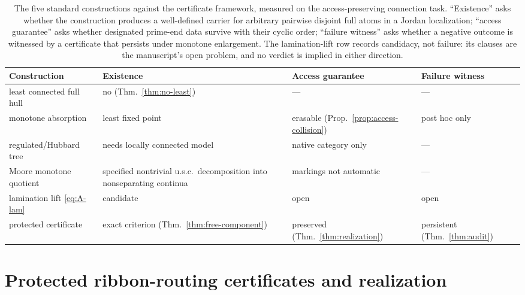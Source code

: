 \documentclass[11pt,reqno]{amsart}
\theoremstyle{definition}
\theoremstyle{remark}
\begin{document}
\begin{table}[H]
\centering
\small
\begin{tabularx}{\textwidth}{@{}P{0.25\textwidth}P{0.22\textwidth}P{0.22\textwidth}Y@{}}
\toprule
Construction & Existence & Access guarantee & Failure witness\\
\midrule
least connected full hull & no (Thm.~\ref{thm:no-least}) & --- & ---\\
monotone absorption & least fixed point \cite{MWman} &
  erasable (Prop.~\ref{prop:access-collision}) & post hoc only\\
regulated/Hubbard tree & needs locally connected model \cite{DH85,KKL26} &
  native category only & ---\\
Moore monotone quotient & specified nontrivial u.s.c.\ decomposition
  into nonseparating continua \cite{Moo25} &
  markings not automatic & ---\\
lamination lift \eqref{eq:A-lam} & candidate \cite{MWman} & open & open\\
protected certificate & exact criterion (Thm.~\ref{thm:free-component}) &
  preserved (Thm.~\ref{thm:realization}) &
  persistent (Thm.~\ref{thm:audit})\\
\bottomrule
\end{tabularx}
\caption{The five standard constructions against the certificate
framework, measured on the access-preserving connection task.  ``Existence''
asks whether the construction produces a well-defined carrier
for arbitrary pairwise disjoint full atoms in a Jordan localization;
``access guarantee'' asks whether designated prime-end data survive
with their cyclic order; ``failure witness'' asks whether a negative
outcome is witnessed by a certificate that persists under monotone
enlargement.  The lamination-lift row records candidacy, not failure:
its clauses are the manuscript's open problem, and no verdict is implied
in either direction.}
\label{tab:A-comparison}
\end{table}


\section{Protected ribbon-routing certificates and realization}
\label{sec:certificates}
\end{document}
